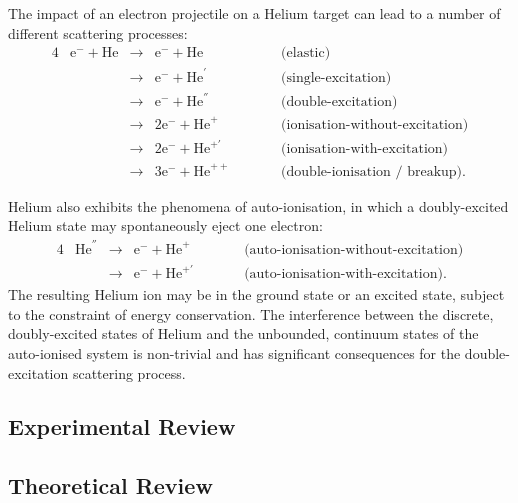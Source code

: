 \documentclass[]{article}
\begin{document}
The impact of an electron projectile on a Helium target can lead to a number of
different scattering processes:
\begin{alignat*}{4}
  &
  \mathrm{e}^{-}
  +
  \mathrm{He}
  &
  {}\to{}
  &
  \mathrm{e}^{-}
  +
  \mathrm{He}
  &
  \quad\quad
  &
  \text{(elastic)}
  \\
  &
  &
  {}\to{}
  &
  \mathrm{e}^{-}
  +
  \mathrm{He}^{'}
  &
  &
  \text{(single-excitation)}
  \\
  &
  &
  {}\to{}
  &
  \mathrm{e}^{-}
  +
  \mathrm{He}^{''}
  &
  &
  \text{(double-excitation)}
  \\
  &
  &
  {}\to{}
  &
  2
  \mathrm{e}^{-}
  +
  \mathrm{He}^{+}
  &
  &
  \text{(ionisation-without-excitation)}
  \\
  &
  &
  {}\to{}
  &
  2
  \mathrm{e}^{-}
  +
  \mathrm{He}^{+'}
  &
  &
  \text{(ionisation-with-excitation)}
  \\
  &
  &
  {}\to{}
  &
  3
  \mathrm{e}^{-}
  +
  \mathrm{He}^{++}
  &
  &
  \text{(double-ionisation / breakup)}
  .
\end{alignat*}


Helium also exhibits the phenomena of auto-ionisation, in which a doubly-excited
Helium state may spontaneously eject one electron:
\begin{alignat*}{4}
  &
  \mathrm{He}^{''}
  &
  {}\to{}
  &
  \mathrm{e}^{-}
  +
  \mathrm{He}^{+}
  &
  \quad\quad
  &
  \text{(auto-ionisation-without-excitation)}
  \\
  &
  &
  {}\to{}
  &
  \mathrm{e}^{-}
  +
  \mathrm{He}^{+'}
  &
  \quad\quad
  &
  \text{(auto-ionisation-with-excitation)}
  .
\end{alignat*}
The resulting Helium ion may be in the ground state or an excited state,
subject to the constraint of energy conservation.
The interference between the discrete, doubly-excited states of Helium and the
unbounded, continuum states of the auto-ionised system is non-trivial and has
significant consequences for the double-excitation scattering process.


\subsection{Experimental Review}
\label{sec:in-exp}

\subsection{Theoretical Review}
\label{sec:in-th}
\end{document}
